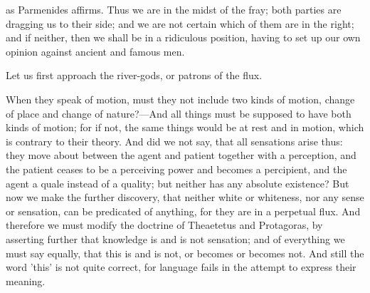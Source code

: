 \documentclass[11pt,letter]{article}
\begin{document}
\par  as Parmenides affirms. Thus we are in the midst of the fray; both parties are dragging us to their side; and we are not certain which of them are in the right; and if neither, then we shall be in a ridiculous position, having to set up our own opinion against ancient and famous men.

\par  Let us first approach the river-gods, or patrons of the flux.

\par  When they speak of motion, must they not include two kinds of motion, change of place and change of nature?—And all things must be supposed to have both kinds of motion; for if not, the same things would be at rest and in motion, which is contrary to their theory. And did we not say, that all sensations arise thus: they move about between the agent and patient together with a perception, and the patient ceases to be a perceiving power and becomes a percipient, and the agent a quale instead of a quality; but neither has any absolute existence? But now we make the further discovery, that neither white or whiteness, nor any sense or sensation, can be predicated of anything, for they are in a perpetual flux. And therefore we must modify the doctrine of Theaetetus and Protagoras, by asserting further that knowledge is and is not sensation; and of everything we must say equally, that this is and is not, or becomes or becomes not. And still the word 'this' is not quite correct, for language fails in the attempt to express their meaning.
\end{document}
